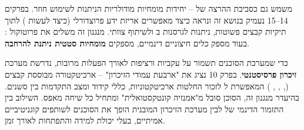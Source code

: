  משמש גם כסביבת ההרצה של \textbf{} – יחידות מומחיות מודולריות הניתנות לשימוש חוזר. בפרקים \num{14}–\num{15} נעמיק בנושא זה ונראה כיצד  מאפשרים אריזת ידע פרוצדורלי (כיצד לעשות ) לתוך תיקיות קבצים פשוטות, ניתנות לגרסנות ב ולשיתוף צוותי. מנגנון זה משלים את פרוטוקול : בעוד  מספק כלים חיצוניים דינמיים,  מספקים \textbf{מומחיות סטטית ניתנת להרחבה}.

כדי שמערכת הסוכנים תשמור על עקביות ורציפות לאורך הפעלות מרובות, נדרשת מערכת \textbf{זיכרון פרסיסטנטי}. בפרק \num{10} נציג את "ארבעת עמודי הזיכרון" – ארכיטקטורה מבוססת קבצים (, , , ) המאפשרת ל לזכור החלטות ארכיטקטוניות, כללי קידוד ומצב התקדמות בין סשנים. בהיעדר מנגנון זה, הסוכן סובל מ"אמנזיה קונטקסטואלית" ומתחיל כל שיחה מאפס. השילוב בין התזמור הדינמי של  לבין מערכת הזיכרון המובנית הופך את הסוכנים לשותפים קוגניטיביים אמיתיים, בעלי יכולת למידה והתפתחות לאורך זמן.

